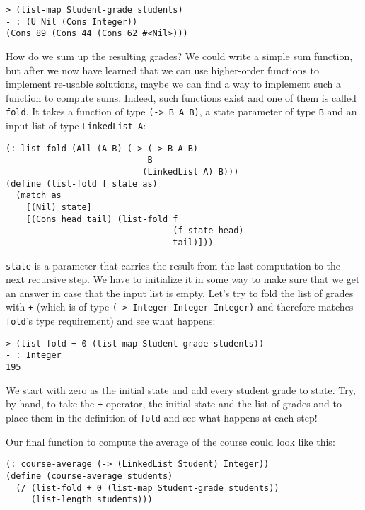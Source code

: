 \documentclass{article}
\begin{document}
\begin{lstlisting}
> (list-map Student-grade students)
- : (U Nil (Cons Integer))
(Cons 89 (Cons 44 (Cons 62 #<Nil>)))
\end{lstlisting}

How do we sum up the resulting grades? We could write a simple sum function, but after we now have learned that we can use higher-order functions to implement re-usable solutions, maybe we can find a way to implement such a function to compute sums. Indeed, such functions exist and one of them is called \lstinline{fold}. It takes a function of type \lstinline{(-> B A B)}, a state parameter of type \lstinline{B} and an input list of type \lstinline{LinkedList A}:

\begin{lstlisting}
(: list-fold (All (A B) (-> (-> B A B)
                            B
                           (LinkedList A) B)))
(define (list-fold f state as)
  (match as
    [(Nil) state]
    [(Cons head tail) (list-fold f
                                 (f state head)
                                 tail)]))
\end{lstlisting}

\lstinline{state} is a parameter that carries the result from the last computation to the next recursive step. We have to initialize it in some way to make sure that we get an answer in case that the input list is empty. Let's try to fold the list of grades with \lstinline{+} (which is of type \lstinline{(-> Integer Integer Integer)} and therefore matches \lstinline{fold}'s type requirement) and see what happens:

\begin{lstlisting}
> (list-fold + 0 (list-map Student-grade students))
- : Integer
195
\end{lstlisting}

We start with zero as the initial state and add every student grade to state. Try, by hand, to take the \lstinline{+} operator, the initial state and the list of grades and to place them in the definition of \lstinline{fold} and see what happens at each step!

Our final function to compute the average of the course could look like this:

\begin{lstlisting}
(: course-average (-> (LinkedList Student) Integer))
(define (course-average students)
  (/ (list-fold + 0 (list-map Student-grade students))
     (list-length students)))
\end{lstlisting}
\end{document}
